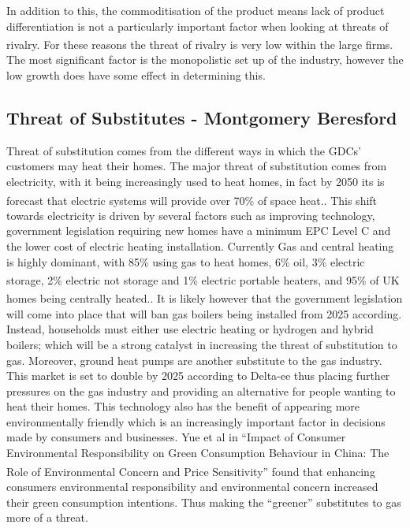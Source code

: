 \documentclass[11pt]{article}		%
\newcommand{\supercite}[1]{\textsuperscript{\cite{#1}}}		%
\begin{document}
                In addition to this, the commoditisation of the product means lack of product differentiation is not a particularly important factor when looking at threats of rivalry.\supercite{Gas_Distribution_Industry}
                For these reasons the threat of rivalry is very low within the large firms. The most significant factor is the monopolistic set up of the industry, however the low growth does have some effect in determining this.

        \subsection[Threat of Substitutes]{Threat of Substitutes - Montgomery Beresford} \label{customerSubstitutes}
                Threat of substitution comes from the different ways in which the GDCs’ customers may heat their homes. The major threat of substitution comes from electricity, with it being increasingly used to heat homes, in fact by 2050 its is forecast that electric systems will provide over 70\% of space heat.\supercite{heating_tech}.  This shift towards electricity is driven by several factors such as improving technology, government legislation requiring new homes have a minimum EPC Level C and the lower cost of electric heating installation. Currently Gas and central heating is highly dominant, with 85\% using gas to heat homes, 6\% oil, 3\% electric storage, 2\% electric not storage and 1\% electric portable heaters\supercite{heating}, and  95\% of UK homes being centrally heated.\supercite{central_heating}. It is likely however that the government legislation will come into place that will ban gas boilers being installed from 2025 according. Instead, households must either use electric heating or hydrogen and hybrid boilers; which will be a strong catalyst in increasing the threat of substitution to gas. 
                Moreover, ground heat pumps are another substitute to the gas industry. This market is set to double by 2025 according to Delta-ee thus placing further pressures on the gas industry and providing an alternative for people wanting to heat their homes. This technology also has the benefit of appearing more environmentally friendly which is an increasingly important factor in decisions made by consumers and businesses. Yue et al in “Impact of Consumer Environmental Responsibility on Green Consumption Behaviour in China: The Role of Environmental Concern and Price Sensitivity” \supercite{Environmental} found that enhancing consumers environmental responsibility and environmental concern increased their green consumption intentions. Thus making the “greener” substitutes to gas more of a threat.
                
\end{document}
